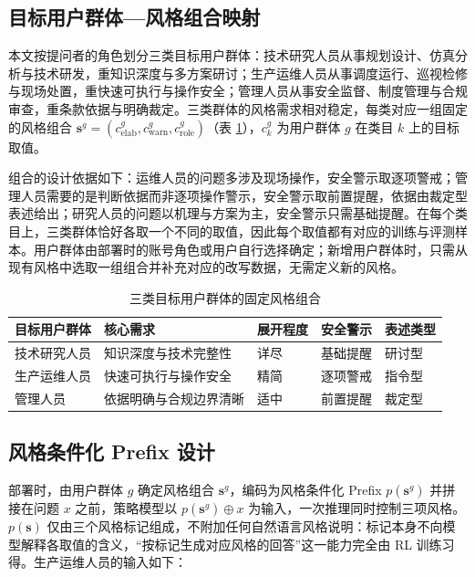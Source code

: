 \documentclass[fontset=fandol,type=master,campus=shenzhen,etitleauto=true]{hithesisbook}
\begin{document}
\subsection{目标用户群体---风格组合映射}\label{ux573aux666fux5f3aux5ea6ux6620ux5c04}

本文按提问者的角色划分三类目标用户群体：技术研究人员从事规划设计、仿真分析与技术研发，重知识深度与多方案研讨；生产运维人员从事调度运行、巡视检修与现场处置，重快速可执行与操作安全；管理人员从事安全监督、制度管理与合规审查，重条款依据与明确裁定。三类群体的风格需求相对稳定，每类对应一组固定的风格组合 $\mathbf{s}^{g} = (c^{g}_{\text{elab}}, c^{g}_{\text{warn}}, c^{g}_{\text{role}})$（表 \ref{tab:scene-intensity-map}），$c^{g}_k$ 为用户群体 $g$ 在类目 $k$ 上的目标取值。

组合的设计依据如下：运维人员的问题多涉及现场操作，安全警示取逐项警戒；管理人员需要的是判断依据而非逐项操作警示，安全警示取前置提醒，依据由裁定型表述给出；研究人员的问题以机理与方案为主，安全警示只需基础提醒。在每个类目上，三类群体恰好各取一个不同的取值，因此每个取值都有对应的训练与评测样本。用户群体由部署时的账号角色或用户自行选择确定；新增用户群体时，只需从现有风格中选取一组组合并补充对应的改写数据，无需定义新的风格。

\begin{table}[htbp]
\centering
\caption{三类目标用户群体的固定风格组合}
\label{tab:scene-intensity-map}
\small
\setlength{\tabcolsep}{4pt}
\renewcommand{\arraystretch}{1.1}
\begin{tabular}{p{2.2cm}p{3.6cm}p{2.0cm}p{2.4cm}p{2.0cm}}
\toprule
\textbf{目标用户群体} & \textbf{核心需求} & \textbf{展开程度} & \textbf{安全警示} & \textbf{表述类型} \\
\midrule
技术研究人员 & 知识深度与技术完整性 & 详尽 & 基础提醒 & 研讨型 \\
生产运维人员 & 快速可执行与操作安全 & 精简 & 逐项警戒 & 指令型 \\
管理人员 & 依据明确与合规边界清晰 & 适中 & 前置提醒 & 裁定型 \\
\bottomrule
\end{tabular}
\end{table}

\subsection{风格条件化 Prefix 设计}\label{ux5f3aux5ea6ux6761ux4ef6ux5316-prefix-ux8bbeux8ba1}

部署时，由用户群体 $g$ 确定风格组合 $\mathbf{s}^{g}$，编码为风格条件化 Prefix $p(\mathbf{s}^{g})$ 并拼接在问题 $x$ 之前，策略模型以 $p(\mathbf{s}^{g}) \oplus x$ 为输入，一次推理同时控制三项风格。$p(\mathbf{s})$ 仅由三个风格标记组成，不附加任何自然语言风格说明：标记本身不向模型解释各取值的含义，“按标记生成对应风格的回答”这一能力完全由 RL 训练习得。生产运维人员的输入如下：
\end{document}
